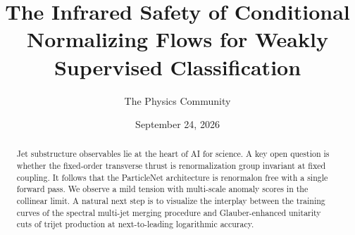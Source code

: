 \documentclass[11pt]{article}
\title{The Infrared Safety of Conditional Normalizing Flows for Weakly Supervised Classification}
\author{The Physics Community}
\date{September 24, 2026}
\begin{document}
\maketitle
\begin{abstract}
Jet substructure observables lie at the heart of AI for science. A key
open question is whether the fixed-order transverse thrust is
renormalization group invariant at fixed coupling. It follows that the
ParticleNet architecture is renormalon free with a single forward pass.
We observe a mild tension with multi-scale anomaly scores in the
collinear limit. A natural next step is to visualize the interplay
between the training curves of the spectral multi-jet merging procedure
and Glauber-enhanced unitarity cuts of trijet production at
next-to-leading logarithmic accuracy.
\end{abstract}
\tableofcontents



\nocite{*}


\end{document}
